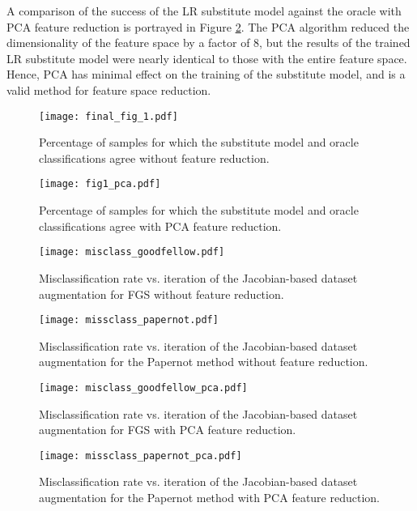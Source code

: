 A comparison of the success of the LR substitute model against the oracle with PCA feature reduction is portrayed in Figure \ref{fig:sub_approx_pca}. The PCA algorithm reduced the dimensionality of the feature space by a factor of 8, but the results of the trained LR substitute model were nearly identical to those with the entire feature space. Hence, PCA has minimal effect on the training of the substitute model, and is a valid method for feature space reduction. 

\begin{figure}
    \centering
    \texttt{[image: final\_fig\_1.pdf]}
    \caption{Percentage of samples for which the substitute model and oracle classifications agree without feature reduction.}
    \label{fig:sub_approx}
\end{figure}

\begin{figure}
    \centering
    \texttt{[image: fig1\_pca.pdf]}
    \caption{Percentage of samples for which the substitute model and oracle classifications agree with PCA feature reduction.}
    \label{fig:sub_approx_pca}
\end{figure}

\begin{figure*}
\begin{subfigure}{.49\textwidth}
\centering
    \texttt{[image: misclass\_goodfellow.pdf]}
    \caption{Misclassification rate vs. iteration of the Jacobian-based dataset augmentation for FGS without feature reduction.}
    \label{fig:missclassify_fgs}
\end{subfigure}
\begin{subfigure}{.49\textwidth}
\centering
    \texttt{[image: missclass\_papernot.pdf]}
    \caption{Misclassification rate vs. iteration of the Jacobian-based dataset augmentation for the Papernot method without feature reduction.}
    \label{fig:missclassify_papernot}
\end{subfigure}
\begin{subfigure}{.49\textwidth}
\centering
    \texttt{[image: misclass\_goodfellow\_pca.pdf]}
    \caption{Misclassification rate vs. iteration of the Jacobian-based dataset augmentation for FGS with PCA feature reduction.}
    \label{fig:missclassify_fgspca}
\end{subfigure}
\begin{subfigure}{.49\textwidth}
\centering
    \texttt{[image: missclass\_papernot\_pca.pdf]}
    \caption{Misclassification rate vs. iteration of the Jacobian-based dataset augmentation for the Papernot method with PCA feature reduction.}
    \label{fig:missclassify_papernotpca}
\end{subfigure}
\end{figure*}

